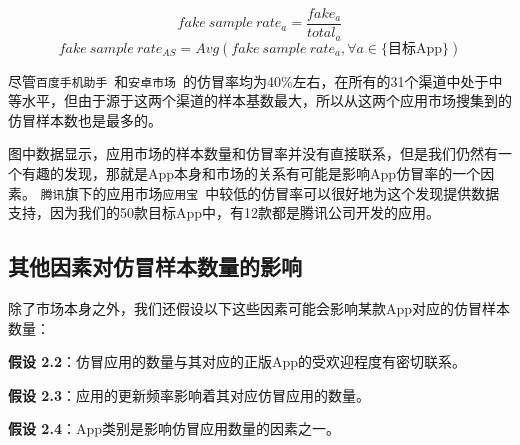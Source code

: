 \begin{equation}
    fake~sample~rate_a = \frac{fake_a}{total_a}
    \label{equ:fake_rate_app}
\end{equation}
\begin{equation}
    fake~sample~rate_{AS} = Avg(fake~sample~rate_a, \forall a \in \text{\{目标App\}})
    \label{equ:fake_rate_mkt}
\end{equation}
\vspace{0.5mm}

尽管\texttt{百度手机助手}~\cite{Baiduappstore}和\texttt{安卓市场}~\cite{Hiapk}的仿冒率均为40\%左右，在所有的31个渠道中处于中等水平，但由于源于这两个渠道的样本基数最大，所以从这两个应用市场搜集到的仿冒样本数也是最多的。

图中数据显示，应用市场的样本数量和仿冒率并没有直接联系，但是我们仍然有一个有趣的发现，那就是App本身和市场的关系有可能是影响App仿冒率的一个因素。
\texttt{腾讯}旗下的应用市场\texttt{应用宝}~\cite{Myapp}中较低的仿冒率可以很好地为这个发现提供数据支持，因为我们的50款目标App中，有12款都是腾讯公司开发的应用。

\subsection{其他因素对仿冒样本数量的影响}
除了市场本身之外，我们还假设以下这些因素可能会影响某款App对应的仿冒样本数量：

{\bf 假设 2.2}：仿冒应用的数量与其对应的正版App的受欢迎程度有密切联系。

{\bf 假设 2.3}：应用的更新频率影响着其对应仿冒应用的数量。

{\bf 假设 2.4}：App类别是影响仿冒应用数量的因素之一。

